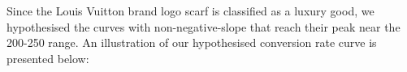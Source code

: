 Since the Louis Vuitton brand logo scarf is classified as a luxury good, we hypothesised the curves with non-negative-slope that reach their peak near the 200-250 \EUR{} range. An illustration of our hypothesised conversion rate curve is presented below:\newline
{} 
\clearpage